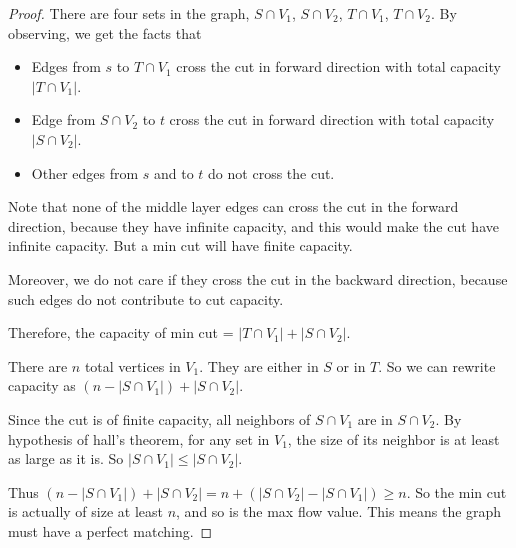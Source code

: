 \begin{proof}
	There are four sets in the graph, $S \cap V_1$, $S \cap V_2$, $T \cap V_1$, $T \cap V_2$. By observing, we get the facts that

	\begin{itemize}
		\item Edges from $s$ to $T \cap V_1$ cross the cut in forward direction with total capacity $|T \cap V_1|$.
		\item Edge from $S \cap V_2$ to $t$ cross the cut in forward direction with total capacity $|S \cap V_2|$.
		\item Other edges from $s$ and to $t$ do not cross the cut.
	\end{itemize}

	Note that none of the middle layer edges can cross the cut in the forward direction, because they have infinite capacity, and this would make the cut have infinite capacity. But a min cut will have finite capacity.
	
	Moreover, we do not care if they cross the cut in the backward direction, because such edges do not contribute to cut capacity.
	
	Therefore, the capacity of min cut = $|T \cap V_1| + |S \cap V_2|$.
	
	There are $n$ total vertices in $V_1$. They are either in $S$ or in $T$. So we can rewrite capacity as $(n- |S \cap V_1|) + |S \cap V_2|$. 
	
	Since the cut is of finite capacity, all neighbors of $S \cap V_1$ are in $S \cap V_2$. By hypothesis of hall's theorem, for any set in $V_1$, the size of its neighbor is at least as large as it is. So $|S \cap V_1| \le |S \cap V_2|$.
	
	Thus $(n- |S \cap V_1|) + |S \cap V_2| = n + (|S \cap V_2| - |S \cap V_1|) \ge n$.
	So the min cut is actually of size at least $n$, and so is the max flow value. This means the graph must have a perfect matching.
	
\end{proof}